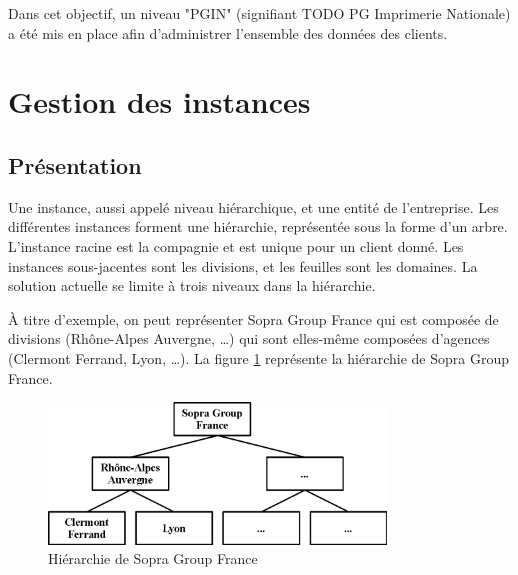 Dans cet objectif, un niveau "PGIN" (signifiant TODO PG Imprimerie Nationale) a été mis en place afin d'administrer l'ensemble des données des clients.


\section{Gestion des instances}


\subsection{Présentation}

Une instance, aussi appelé niveau hiérarchique, et une entité de l'entreprise.
Les différentes instances forment une hiérarchie, représentée sous la forme d'un arbre.
L'instance racine est la compagnie et est unique pour un client donné.
Les instances sous-jacentes sont les divisions, et les feuilles sont les domaines.
La solution actuelle se limite à trois niveaux dans la hiérarchie.

À titre d'exemple, on peut représenter Sopra Group France qui est composée de divisions (Rhône-Alpes Auvergne, \ldots) qui sont elles-même composées d'agences (Clermont Ferrand, Lyon, \ldots).
La figure \ref{hierarchie_Sopra_Group} représente la hiérarchie de Sopra Group France.
\begin{figure}[!h]
	\center
	\includegraphics[width=0.8\textwidth]{img/hierarchie_Sopra_Group.png}
	\caption{Hiérarchie de Sopra Group France}
	\label{hierarchie_Sopra_Group}
\end{figure}
~~\\

